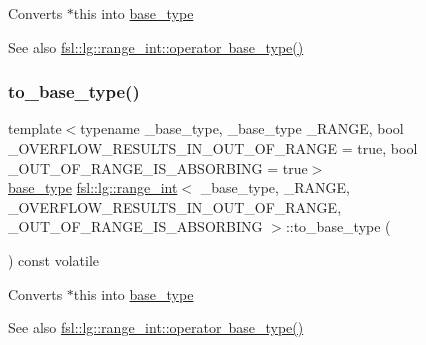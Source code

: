 Converts $\ast$this into \mbox{\hyperlink{classfsl_1_1lg_1_1range__int_a4ce67cd216fd303b7bae83a7cbcab3bb}{base\+\_\+type}} \begin{DoxySeeAlso}{See also}
\mbox{\hyperlink{classfsl_1_1lg_1_1range__int_aa7a3f65fd702219d850343d11519f202}{fsl\+::lg\+::range\+\_\+int\+::operator base\+\_\+type()}} 
\end{DoxySeeAlso}
\mbox{\label{classfsl_1_1lg_1_1range__int_a0aee35f66c35553f8057b113fdf5ba68}} 
\subsubsection{\texorpdfstring{to\_base\_type()}{to\_base\_type()}\hspace{0.1cm}{\footnotesize\ttfamily [2/2]}}
{\footnotesize\ttfamily template$<$typename \+\_\+base\+\_\+type, \+\_\+base\+\_\+type \+\_\+\+R\+A\+N\+GE, bool \+\_\+\+O\+V\+E\+R\+F\+L\+O\+W\+\_\+\+R\+E\+S\+U\+L\+T\+S\+\_\+\+I\+N\+\_\+\+O\+U\+T\+\_\+\+O\+F\+\_\+\+R\+A\+N\+GE = true, bool \+\_\+\+O\+U\+T\+\_\+\+O\+F\+\_\+\+R\+A\+N\+G\+E\+\_\+\+I\+S\+\_\+\+A\+B\+S\+O\+R\+B\+I\+NG = true$>$ \\
\mbox{\hyperlink{classfsl_1_1lg_1_1range__int_a4ce67cd216fd303b7bae83a7cbcab3bb}{base\+\_\+type}} \mbox{\hyperlink{classfsl_1_1lg_1_1range__int}{fsl\+::lg\+::range\+\_\+int}}$<$ \+\_\+base\+\_\+type, \+\_\+\+R\+A\+N\+GE, \+\_\+\+O\+V\+E\+R\+F\+L\+O\+W\+\_\+\+R\+E\+S\+U\+L\+T\+S\+\_\+\+I\+N\+\_\+\+O\+U\+T\+\_\+\+O\+F\+\_\+\+R\+A\+N\+GE, \+\_\+\+O\+U\+T\+\_\+\+O\+F\+\_\+\+R\+A\+N\+G\+E\+\_\+\+I\+S\+\_\+\+A\+B\+S\+O\+R\+B\+I\+NG $>$\+::to\+\_\+base\+\_\+type (\begin{DoxyParamCaption}{ }\end{DoxyParamCaption}) const volatile\hspace{0.3cm}{\ttfamily [inline]}}

Converts $\ast$this into \mbox{\hyperlink{classfsl_1_1lg_1_1range__int_a4ce67cd216fd303b7bae83a7cbcab3bb}{base\+\_\+type}} \begin{DoxySeeAlso}{See also}
\mbox{\hyperlink{classfsl_1_1lg_1_1range__int_aa7a3f65fd702219d850343d11519f202}{fsl\+::lg\+::range\+\_\+int\+::operator base\+\_\+type()}} 
\end{DoxySeeAlso}


